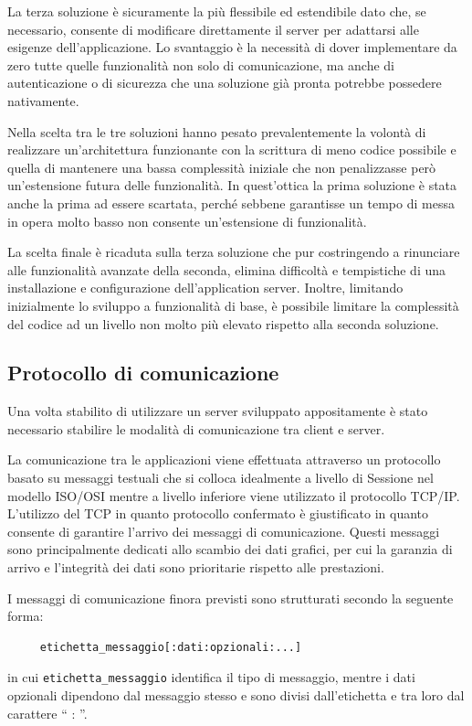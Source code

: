 La terza soluzione \`e sicuramente la pi\`u flessibile ed estendibile dato che, se necessario, consente di modificare direttamente il server per adattarsi alle esigenze dell'applicazione. Lo svantaggio \`e la necessit\`a di dover implementare da zero tutte quelle funzionalit\`a non solo di comunicazione, ma anche di autenticazione o di sicurezza che una soluzione gi\`a pronta potrebbe possedere nativamente.

Nella scelta tra le tre soluzioni hanno pesato prevalentemente la volont\`a di realizzare un'architettura funzionante con la scrittura di meno codice possibile e quella di mantenere una bassa complessit\`a iniziale che non penalizzasse per\`o un'estensione futura delle funzionalit\`a. In quest'ottica la prima soluzione \`e stata anche la prima ad essere scartata, perch\'e sebbene garantisse un tempo di messa in opera molto basso non consente un'estensione di funzionalit\`a. 

La scelta finale \`e ricaduta sulla terza soluzione che pur costringendo a rinunciare alle funzionalit\`a avanzate della seconda, elimina difficolt\`a e tempistiche di una installazione e configurazione dell'application server. Inoltre, limitando inizialmente lo sviluppo a funzionalit\`a di base, \`e possibile limitare la complessit\`a del codice ad un livello non molto pi\`u elevato rispetto alla seconda soluzione.

\subsection{Protocollo di comunicazione}
\label{sub:comprotocol}
Una volta stabilito di utilizzare un server sviluppato appositamente \`e stato necessario stabilire le modalit\`a di comunicazione tra client e server. 

La comunicazione tra le applicazioni viene effettuata attraverso un protocollo basato su messaggi testuali che si colloca idealmente a livello di Sessione nel modello ISO/OSI \cite{book:computernetworking} mentre a livello inferiore viene utilizzato il protocollo TCP/IP.
L'utilizzo del TCP in quanto protocollo confermato \`e giustificato in quanto consente di garantire l'arrivo dei messaggi di comunicazione. Questi messaggi sono principalmente dedicati allo scambio dei dati grafici, per cui la garanzia di arrivo e l'integrit\`a dei dati sono prioritarie rispetto alle prestazioni.


I messaggi di comunicazione finora previsti sono strutturati secondo la seguente forma:
\begin{verbatim}
     etichetta_messaggio[:dati:opzionali:...]
\end{verbatim}
in cui \texttt{etichetta\_messaggio} identifica il tipo di messaggio, mentre i dati opzionali dipendono dal messaggio stesso e sono divisi dall'etichetta e tra loro dal carattere `` : ''.

